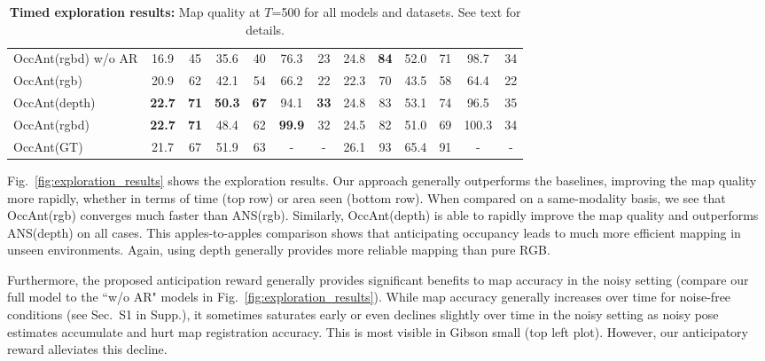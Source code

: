 \documentclass[runningheads]{llncs}
\newcommand{\tb}[1]{\textbf{#1}}
\begin{document}
\begin{table}[!t]
\begin{minipage}{\linewidth}
{\begin{tabular}{@{}lcccccccccccc@{}}
    OccAnt(rgbd) w/o AR            &     16.9           &      45        &     35.6        &     40          &     76.3         &       23        &       24.8        &   \tb{84}       &       52.0        &       71      &     98.7         &       34       \\
    OccAnt(rgb)                    &     20.9           &      62        &     42.1        &     54          &     66.2         &       22        &       22.3        &       70        &       43.5        &       58      &     64.4         &       22       \\
    OccAnt(depth)                  & \tb{22.7}          &  \tb{71}       & \tb{50.3}       & \tb{67}         &     94.1         &   \tb{33}       &       24.8        &       83        &       53.1        &       74      &     96.5         &       35       \\ 
    OccAnt(rgbd)                   & \tb{22.7}          &  \tb{71}       &     48.4        &     62          & \tb{99.9}        &       32        &       24.5        &       82        &       51.0        &       69      &    100.3         &       34       \\ \midrule
    \rowcolor{Gray} OccAnt(GT)     &     21.7           &      67        &     51.9        &     63          &       -          &         -       &       26.1        &       93        &       65.4        &       91      &       -          &       -        \\ \bottomrule
    \end{tabular}
    }
\caption{\small\textbf{Timed exploration results:} Map quality at $T$=500 for all models and datasets. See text for details.}
\label{tab:exploration_results}
\end{minipage}\hfill
\end{table}

Fig.~\ref{fig:exploration_results} shows the exploration results. Our approach generally outperforms the baselines, improving the map quality more rapidly, whether in terms of time (top row) or area seen (bottom row). When compared on a same-modality basis, we see that OccAnt(rgb) converges much faster than ANS(rgb). Similarly, OccAnt(depth) is able to rapidly improve the map quality and outperforms ANS(depth) on all cases. This apples-to-apples comparison shows that anticipating occupancy leads to much more efficient mapping in unseen environments. Again, using depth generally provides more reliable mapping than pure RGB.

Furthermore, the proposed anticipation reward generally provides significant benefits to map accuracy in the noisy setting (compare our full model to the ``w/o AR" models in Fig.~\ref{fig:exploration_results}). While map accuracy generally increases over time for noise-free conditions (see Sec.~S1 in Supp.), it sometimes saturates early or even declines slightly over time in the noisy setting as noisy pose estimates accumulate and hurt map registration accuracy.  This is most visible in Gibson small (top left plot). However, our anticipatory reward alleviates this decline.
\end{document}
